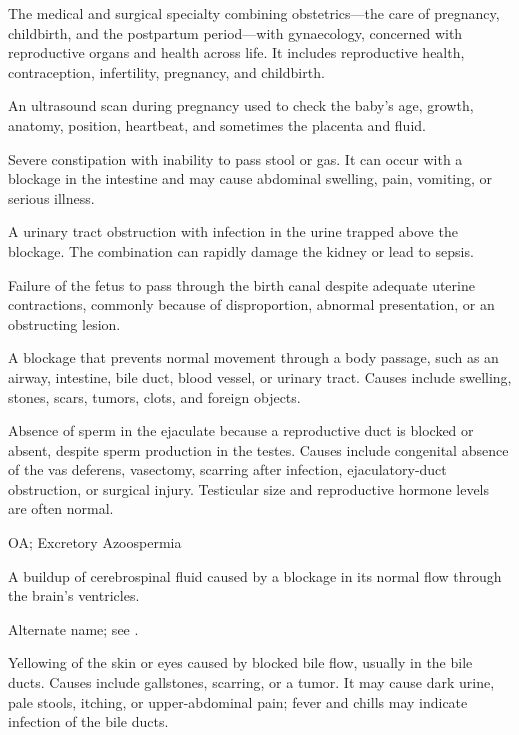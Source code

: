  The medical and surgical specialty combining obstetrics—the care of
pregnancy, childbirth, and the postpartum period—with gynaecology, concerned with
reproductive organs and health across life. It includes reproductive health, contraception,
infertility, pregnancy, and childbirth.

 An ultrasound scan during pregnancy used to check the baby's age, growth, anatomy, position, heartbeat, and sometimes the placenta and fluid.

 Severe constipation with inability to pass stool or gas. It can occur with a blockage in the intestine and may cause abdominal swelling, pain, vomiting, or serious illness.

 A urinary tract obstruction with infection in the urine trapped above the blockage. The combination can rapidly damage the kidney or lead to sepsis.

 Failure of the fetus to pass through the birth canal despite adequate uterine contractions, commonly because of disproportion, abnormal presentation, or an obstructing lesion.

 A blockage that prevents normal movement through a body passage, such as an airway, intestine, bile duct, blood vessel, or urinary tract. Causes include swelling, stones, scars, tumors, clots, and foreign objects.

 Absence of sperm in the ejaculate because a reproductive duct is blocked or absent,
despite sperm production in the testes. Causes include congenital absence of the vas deferens, vasectomy,
scarring after infection, ejaculatory-duct obstruction, or surgical injury. Testicular size and reproductive
hormone levels are often normal.

\synonyms
OA; Excretory Azoospermia

 A buildup of cerebrospinal fluid caused by a blockage in its normal flow through the brain's ventricles.

 Alternate name; see .

 Yellowing of the skin or eyes caused by blocked bile flow, usually in the bile ducts. Causes include gallstones, scarring, or a tumor. It may cause dark urine, pale stools, itching, or upper-abdominal pain; fever and chills may indicate infection of the bile ducts.

